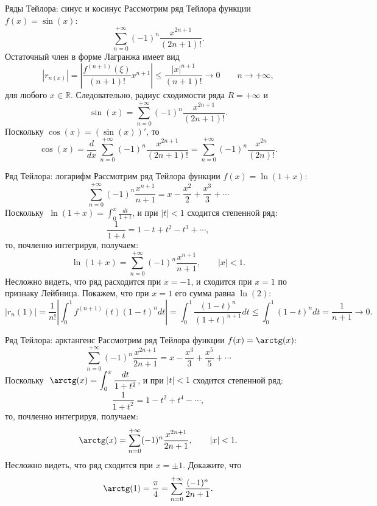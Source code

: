 \documentclass[8pt]{beamer}
\begin{document}
\begin{frame}{Ряды Тейлора: синус и косинус}
Рассмотрим ряд Тейлора функции $ f(x) =\sin(x)$:
$$\sum_{n=0}^{+\infty} (-1)^n \frac{x^{2n+1}}{(2n+1)!}.$$
Остаточный член в форме Лагранжа имеет вид
$$|r_{n(x)}| = \left| \frac{f^{(n+1)}(\xi)}{(n+1)!}x^{n+1} \right| 
\le \frac{|x|^{n+1}}{(n+1)!} \to0 \qquad n\to+\infty,$$
для любого $x\in\mathbb{R}$. Следовательно, радиус сходимости ряда $R=+\infty$ и
$$\sin(x) = \sum_{n=0}^{+\infty}(-1)^n \frac{x^{2n+1}}{(2n+1)!}.$$
Поскольку $\cos(x) = (\sin(x))'$, то
$$\cos(x) = \frac{d}{dx}\ \sum_{n=0}^{+\infty}(-1)^n \frac{x^{2n+1}}{(2n+1)!} = \sum_{n=0}^{+\infty}(-1)^n \frac{x^{2n}}{(2n)!}.$$
\end{frame}

\begin{frame}{Ряд Тейлора: логарифм}
Рассмотрим ряд Тейлора функции $ f(x) =\ln(1+x)$:
$$\sum_{n=0}^{+\infty}(-1)^n\frac{x^{n+1}}{n+1}= x-\frac{x^2}{2}+\frac{x^3}{3}+\cdots$$
Поскольку  $\ \displaystyle \ln(1+x) = \int_{0}^x\frac{dt}{1+t}$,
и при $|t|<1$ сходится степенной ряд:
$$\frac{1}{1+t} = 1-t+t^2-t^3+\cdots,$$
то, почленно интегрируя, получаем:
$$\ln(1+x) = \sum_{n=0}^{+\infty}(-1)^n\frac{x^{n+1}}{n+1},\qquad |x|<1.$$
Несложно видеть, что ряд расходится при $x=-1$, и сходится при $x=1$ по признаку Лейбница. Покажем, что при $x=1$ его сумма равна $\ln(2)$:
$$|r_n(1)|=\frac{1}{n!}\left|\int_0^1 f^{(n+1)}(t)(1-t)^n dt\right|=
\int_0^1 \frac{(1-t)^n}{(1+t)^{n+1}} dt\le \int_0^1(1-t)^n dt = \frac{1}{n+1}\to0.$$
\end{frame}

\begin{frame}{Ряд Тейлора: арктангенс}
Рассмотрим ряд Тейлора функции $ f(x) =\arctg(x)$:
$$\sum_{n=0}^{+\infty}(-1)^n\frac{x^{2n+1}}{2n+1}= x-\frac{x^3}{3}+\frac{x^5}{5}+\cdots$$
Поскольку  $\ \displaystyle \arctg(x) = \int_{0}^x\frac{dt}{1+t^2}$,
и при $|t|<1$ сходится степенной ряд:
$$\frac{1}{1+t^2} = 1-t^2+t^4-\cdots,$$
то, почленно интегрируя, получаем:
$$\arctg(x) = \sum_{n=0}^{+\infty}(-1)^n\frac{x^{2n+1}}{2n+1},\qquad |x|<1.$$
Несложно видеть, что ряд сходится при $x=\pm1$. Докажите, что
$$\arctg(1) = \frac{\pi}{4} = \sum_{n=0}^{+\infty}\frac{(-1)^n}{2n+1}.$$
\end{frame}
\end{document}

